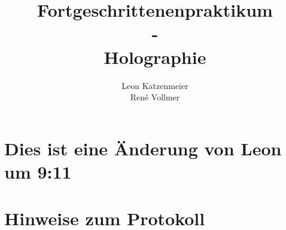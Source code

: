\documentclass[10pt,a4paper]{article}
\begin{document}

\title{Fortgeschrittenenpraktikum\\ -\\ Holographie }
\author{Leon Katzenmeier \\ René Vollmer}

\maketitle
\newpage

\tableofcontents
\vfill
\newpage


\section{Dies ist eine Änderung von Leon um 9:11}
\section{Hinweise zum Protokoll}
\end{document}

